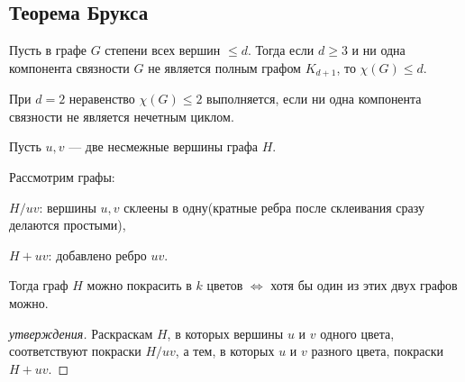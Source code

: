 \subsection{Теорема Брукса}

\begin{theorem}[Брукс, 1941]
    Пусть в графе $G$ степени всех вершин $\leq d$. Тогда если $d \geq 3$ и ни одна компонента связности $G$ не является полным графом $K_{d+1}$, то $\chi(G) \leq d$.

    При $d = 2$ неравенство $\chi(G) \leq 2$ выполняется, если ни одна компонента связности не является нечетным циклом.
\end{theorem}

\begin{statement}
    Пусть $u, v$ --- две несмежные вершины графа $H$.

    Рассмотрим графы:

    $H / uv$: вершины $u, v$ склеены в одну(кратные ребра после склеивания сразу делаются простыми),

    $H + uv$: добавлено ребро $uv$.

    Тогда граф $H$ можно покрасить в $k$ цветов $\iff$ хотя бы один из этих двух графов можно.
\end{statement}

\begin{proof}[ утверждения]
    Раскраскам $H$, в которых вершины $u$ и $v$ одного цвета, соответствуют покраски $H / uv$, а тем, в которых $u$ и $v$ разного цвета, покраски $H + uv$.
\end{proof}

